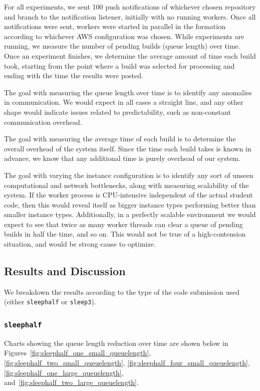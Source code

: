 \documentclass{scrartcl}
\begin{document}
For all experiments, we sent 100 push notifications of whichever chosen repository and branch to the notification listener, initially with no running workers.
Once all notifications were sent, workers were started in parallel in the formation according to whichever AWS configuration was chosen.
While experiments are running, we measure the number of pending builds (queue length) over time.
Once an experiment finishes, we determine the average amount of time each build took, starting from the point where a build was selected for processing and ending with the time the results were posted.

The goal with measuring the queue length over time is to identify any anomalies in communication.
We would expect in all cases a straight line, and any other shape would indicate issues related to predictability, such as non-constant communication overhead.

The goal with measuring the average time of each build is to determine the overall overhead of the system itself.
Since the time each build takes is known in advance, we know that any additional time is purely overhead of our system.

The goal with varying the instance configuration is to identify any sort of unseen computational and network bottlenecks, along with measuring scalability of the system.
If the worker process is CPU-intensive independent of the actual student code, then this would reveal itself as bigger instance types performing better than smaller instance types.
Additionally, in a perfectly scalable environment we would expect to see that twice as many worker threads can clear a queue of pending builds in half the time, and so on.
This would not be true of a high-contension situation, and would be strong cause to optimize.

\subsection{Results and Discussion}
We breakdown the results according to the type of the code submission used (either \texttt{sleephalf} or \texttt{sleep3}).

\subsubsection{\texttt{sleephalf}}
\label{sec:sleephalf}
Charts showing the queue length reduction over time are shown below in Figures~\ref{fig:sleephalf_one_small_queuelength}, \ref{fig:sleephalf_two_small_queuelength}, \ref{fig:sleephalf_four_small_queuelength}, \ref{fig:sleephalf_one_large_queuelength}, and~\ref{fig:sleephalf_two_large_queuelength}.
\end{document}
